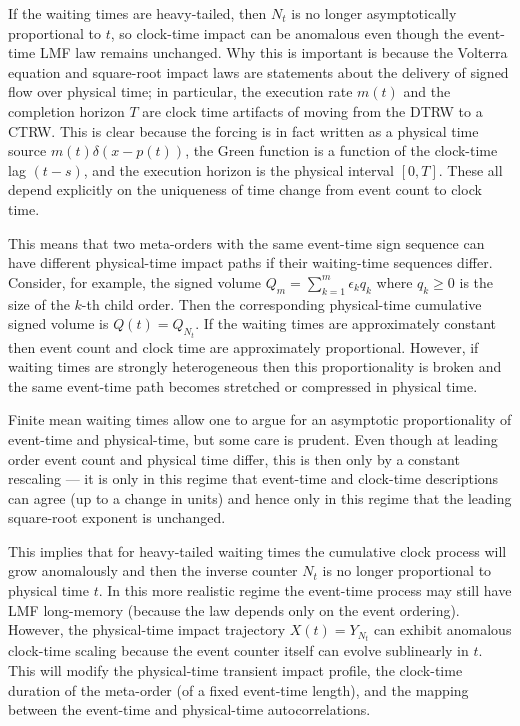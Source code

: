 \documentclass[5p,final]{elsarticle}
\begin{document}
If the waiting times are heavy-tailed, then $N_t$ is no longer asymptotically proportional to $t$, so clock-time impact can be anomalous even though the event-time LMF law remains unchanged. Why this is important is because the Volterra equation and square-root impact laws are statements about the delivery of signed flow over physical time; in particular, the execution rate $m(t)$  and the completion horizon $T$ are clock time artifacts of moving from the DTRW to a CTRW. This is clear because the forcing is in fact written as a physical time source $m(t) \delta(x-p(t))$, the Green function is a function of the clock-time lag $(t-s)$, and the execution horizon is the physical interval $[0,T]$. These all depend explicitly on the uniqueness of time change from event count to clock time. 

This means that two meta-orders with the same event-time sign sequence can have different physical-time impact paths if their waiting-time sequences differ. Consider, for example, the signed volume $Q_m = \sum_{k=1}^m {\epsilon_k q_k}$ where $q_k \ge 0$ is the size of the $k$-th child order. Then the corresponding physical-time cumulative signed volume is $Q(t) = Q_{N_t}$. If the waiting times are approximately constant then event count and clock time are approximately proportional. However, if waiting times are strongly heterogeneous then this proportionality is broken and the same event-time path becomes stretched or compressed in physical time. 

Finite mean waiting times allow one to argue for an asymptotic proportionality of event-time and physical-time, but some care is prudent. Even though at leading order event count and physical time differ, this is then only by a constant rescaling --- it is only in this regime that event-time and clock-time descriptions can agree (up to a change in units) and hence only in this regime that the leading square-root exponent is unchanged. 

This implies that for heavy-tailed waiting times the cumulative clock process will grow anomalously and then the inverse counter $N_t$ is no longer proportional to physical time $t$. In this more realistic regime the event-time process may still have LMF long-memory (because the law depends only on the event ordering). However, the physical-time impact trajectory $X(t) = Y_{N_t}$ can exhibit anomalous clock-time scaling because the event counter itself can evolve sublinearly in $t$. This will modify the physical-time transient impact profile, the clock-time duration of the meta-order (of a fixed event-time length), and the mapping between the event-time and physical-time autocorrelations. 
\end{document}
